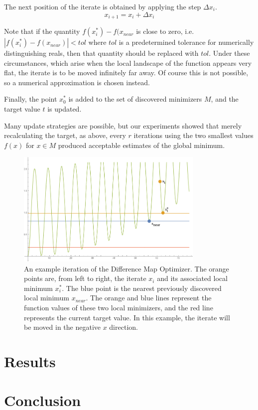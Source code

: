 \documentclass[12pt]{article}
\begin{document}
    The next position of the iterate is obtained by applying the step
    $\Delta x_i$.
    $$
        x_{i+1} = x_i + \Delta x_i
    $$

    Note that if the quantity $f(x_i^*) - f(x_{near}$ is close to zero, i.e.
    $|f(x_i^*) - f(x_{near})| < tol$ where $tol$ is a predetermined tolerance
    for numerically distinguishing reals, then that quantity should be
    replaced with $tol$.
    Under these circumstances, which arise when the local landscape of the
    function appears very flat, the iterate is to be moved infinitely far away.
    Of course this is not possible, so a numerical approximation is chosen
    instead.

    Finally, the point $x_0^*$ is added to the set of discovered minimizers
    $M$, and the target value $t$ is updated.

    Many update strategies are possible, but our experiments showed that merely
    recalculating the target, as above, every $r$ iterations using the two
    smallest values $f(x)$ for $x \in M$ produced acceptable estimates of the
    global minimum.

    \begin{figure}
        \begin{center}
            \includegraphics[width=0.8\textwidth]{../figures/iteratingnew.png}
            \caption{An example iteration of the Difference Map Optimizer.
                The orange points are, from left to right, the iterate $x_i$
                and its associated local minimum $x_i^*$. The blue point is the
                nearest previously discovered local minimum $x_{near}$.
                The orange and blue lines represent the function values of
                these two local minimizers, and the red line represents the
                current target value. In this example, the iterate will be
                moved in the negative $x$ direction.}
        \end{center}
        \label{fig:iteration}
    \end{figure}

\section{Results}

\section{Conclusion}

\pagebreak



\end{document}
